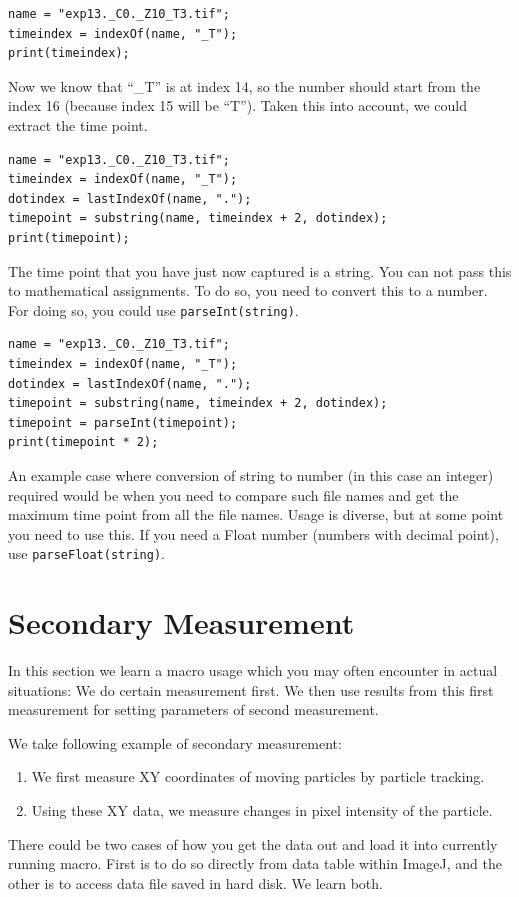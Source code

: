 \documentclass[11pt,a4paper,oneside]{report}
\newcommand{\ilcom}[1]{\texttt{\small#1}}
\begin{document}
\begin{lstlisting}
name = "exp13._C0._Z10_T3.tif";
timeindex = indexOf(name, "_T");
print(timeindex);
\end{lstlisting}

Now we know that ``\_T'' is at index 14, so the number should start from the index 16 (because index 15 will be ``T''). Taken this into account, we could extract the time point. 

\begin{lstlisting}
name = "exp13._C0._Z10_T3.tif";
timeindex = indexOf(name, "_T");
dotindex = lastIndexOf(name, ".");
timepoint = substring(name, timeindex + 2, dotindex);
print(timepoint);
\end{lstlisting}

The time point that you have just now captured is a string. You can not pass this to mathematical assignments. To do so, you need to convert this to a number. For doing so, you could use \ilcom{parseInt(string)}. 

\begin{lstlisting}
name = "exp13._C0._Z10_T3.tif";
timeindex = indexOf(name, "_T");
dotindex = lastIndexOf(name, ".");
timepoint = substring(name, timeindex + 2, dotindex);
timepoint = parseInt(timepoint);
print(timepoint * 2);
\end{lstlisting}

An example case where conversion of string to number (in this case an integer) required would be when you need to compare such file names and get the maximum time point from all the file names. Usage is diverse, but at some point you need to use this. If you need a Float number (numbers with decimal point), use \ilcom{parseFloat(string)}.


\section{Secondary Measurement}
In this section we learn a macro usage which you may often encounter in actual situations: 
We do certain measurement first. We then use results from this first measurement for 
setting parameters of second measurement.  

We take following example of secondary measurement: 
\begin{enumerate}
\item We first measure XY coordinates of moving particles by particle tracking.  
\item Using these XY data, we measure changes in pixel intensity of the particle.
\end{enumerate} 
There could be two cases of how you get the data out and load it into currently running macro. 
First is to do so directly from data table within ImageJ, 
and the other is to access data file saved in hard disk. We learn both. 
\end{document}
